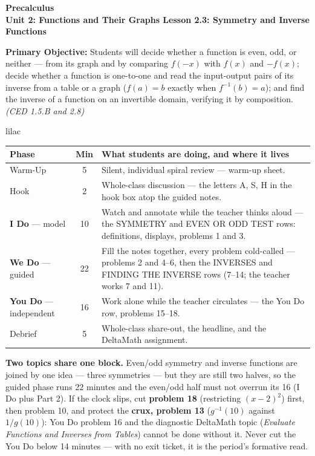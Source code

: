 \documentclass[10pt]{article}
\newcommand{\CourseName}{Precalculus}
\newcommand{\UnitNumberName}{Unit 2: Functions and Their Graphs \quad}
\newcommand{\LessonNumberName}{Lesson 2.3: Symmetry and Inverse Functions}
\begin{document}
\begin{center}
    {\Large\bfseries \CourseName \\
    {\small\bfseries \UnitNumberName \LessonNumberName}}
\end{center}

\begin{tcolorbox}[colback=lilac, colframe=plum, boxrule=0.9pt, arc=2mm,
    left=2mm, right=2mm, top=1.5mm, bottom=1.5mm]
    \textbf{Primary Objective:} Students will decide whether a function is even, odd, or
    neither --- from its graph and by comparing $f(-x)$ with $f(x)$ and $-f(x)$; decide whether
    a function is one-to-one and read the input-output pairs of its inverse from a table or a
    graph ($f(a) = b$ exactly when $f^{-1}(b) = a$); and find the inverse of a function on an
    invertible domain, verifying it by composition.
    \hfill\textit{\small (CED 1.5.B and 2.8)}
\end{tcolorbox}

\boxguard[22]
\begin{skillbox}{lilac}
\small
\renewcommand{\arraystretch}{1.25}
\begin{tabularx}{\linewidth}{@{} l c X @{}}
\textbf{Phase} & \textbf{Min} & \textbf{What students are doing, and where it lives} \\
\midrule
Warm-Up                       & 5  & Silent, individual spiral review --- warm-up sheet. \\
Hook                          & 2  & Whole-class discussion --- the letters A, S, H in the hook box atop the guided notes. \\
\textbf{I Do} --- model       & 10 & Watch and annotate while the teacher thinks aloud --- the SYMMETRY and EVEN OR ODD TEST rows: definitions, displays, problems 1 and 3. \\
\textbf{We Do} --- guided     & 22 & Fill the notes together, every problem cold-called --- problems 2 and 4--6, then the INVERSES and FINDING THE INVERSE rows (7--14; the teacher works 7 and 11). \\
\textbf{You Do} --- independent & 16 & Work alone while the teacher circulates --- the You Do row, problems 15--18. \\
Debrief                       & 5  & Whole-class share-out, the headline, and the DeltaMath assignment. \\
\end{tabularx}

\smallskip
\textbf{Two topics share one block.} Even/odd symmetry and inverse functions are joined by
one idea --- three symmetries --- but they are still two halves, so the guided phase runs 22
minutes and the even/odd half must not overrun its 16 (I Do plus Part 2). If the clock slips,
cut \textbf{problem 18} (restricting $(x - 2)^2$) first, then problem 10, and protect the
\textbf{crux, problem 13} ($g^{-1}(10)$ against $1/g(10)$): You Do problem 16 and the
diagnostic DeltaMath topic (\textit{Evaluate Functions and Inverses from Tables}) cannot be done without
it. Never cut the You Do below 14 minutes --- with no exit ticket, it is the period's formative
read.
\end{skillbox}
\end{document}
